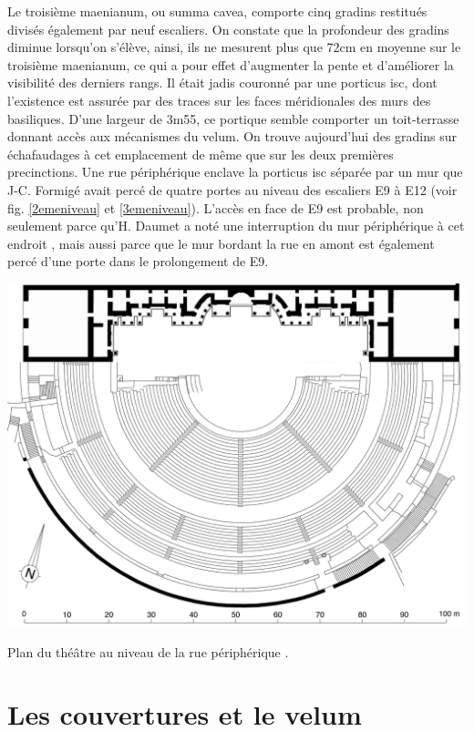 		Le troisième \gls{maenianum}, ou \gls{summa cavea}, comporte cinq gradins restitués divisés également par neuf escaliers. On constate que la profondeur des gradins diminue lorsqu'on s'élève, ainsi, ils ne mesurent plus que 72cm en moyenne sur le troisième \gls{maenianum}, ce qui a pour effet d'augmenter la pente et d'améliorer la visibilité des derniers rangs. Il était jadis couronné par une \gls{porticus isc}, dont l'existence est assurée par des traces sur les faces méridionales des murs des \glspl{basilique}. D'une largeur de 3m55, ce portique semble comporter un toit-terrasse donnant accès aux mécanismes du \gls{velum}. On trouve aujourd'hui des gradins sur échafaudages à cet emplacement de même que sur les deux premières \glspl{precinction}. Une rue périphérique enclave la \gls{porticus isc} séparée par un mur que J-C. Formigé avait percé de quatre portes au niveau des escaliers E9 à E12 (voir fig. \ref{2emeniveau} et \ref{3emeniveau}). L'accès en face de E9 est probable, non seulement parce qu'H. Daumet a noté une interruption du mur périphérique à cet endroit \cite[Pl. VII]{orangePl}, mais aussi parce que le mur bordant la rue en amont est également percé d'une porte dans le prolongement de E9.


	\begin{figureth}
		\includegraphics[width=\linewidth]{images/3emeniveau}
		\caption[Vue de dessus - 3ème niveau]{Plan du théâtre au niveau de la rue périphérique \footnotemark.}
		\label{3emeniveau}
	\end{figureth}	
		
\section{Les couvertures et le \gls{velum}}
		
